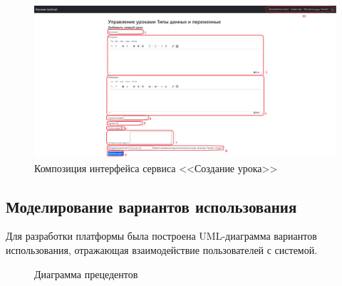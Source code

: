 \begin{figure}[h]
	\centering
	\includegraphics[width=1\linewidth]{images/создатьурок}
	\caption{Композиция интерфейса сервиса <<Создание урока>>}
	\label{templ:image12}
\end{figure}

\clearpage
\subsection{Моделирование вариантов использования}

Для разработки платформы была построена UML-диаграмма вариантов использования, отражающая взаимодействие пользователей с системой.

\begin{figure}[ht]
	\caption{Диаграмма прецедентов}
	\label{comp:image}
\end{figure}

